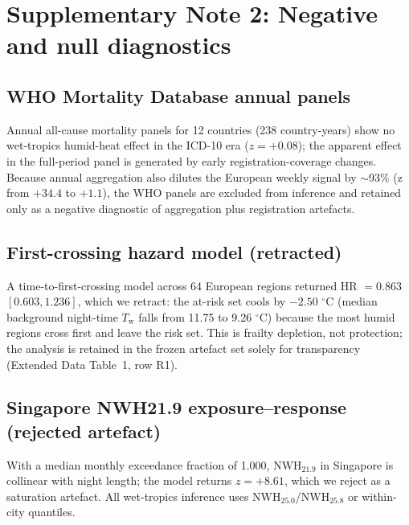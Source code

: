 \documentclass[12pt,a4paper]{article}
\newcommand{\dd}{\ensuremath{\,^{\circ}\mathrm{C}}}
\begin{document}
\section*{Supplementary Note 2: Negative and null diagnostics}
\subsection*{WHO Mortality Database annual panels}
Annual all-cause mortality panels for 12 countries (238 country-years) show no wet-tropics
humid-heat effect in the ICD-10 era ($z=+0.08$); the apparent effect in the full-period panel is
generated by early registration-coverage changes. Because annual aggregation also dilutes the
European weekly signal by $\sim$93\% (z from $+34.4$ to $+1.1$), the WHO panels are excluded from
inference and retained only as a negative diagnostic of aggregation plus registration artefacts.

\subsection*{First-crossing hazard model (retracted)}
A time-to-first-crossing model across 64 European regions returned HR $=0.863$ $[0.603,1.236]$,
which we retract: the at-risk set cools by $-2.50\,\dd$ (median background night-time
$T_\mathrm{w}$ falls from 11.75 to 9.26\,\dd) because the most humid regions cross first and leave
the risk set. This is frailty depletion, not protection; the analysis is retained in the frozen
artefact set solely for transparency (Extended Data Table~1, row R1).

\subsection*{Singapore NWH21.9 exposure--response (rejected artefact)}
With a median monthly exceedance fraction of 1.000, $\mathrm{NWH}_{21.9}$ in Singapore is
collinear with night length; the model returns $z=+8.61$, which we reject as a saturation
artefact. All wet-tropics inference uses $\mathrm{NWH}_{25.0}$/$\mathrm{NWH}_{25.8}$ or
within-city quantiles.
\end{document}
